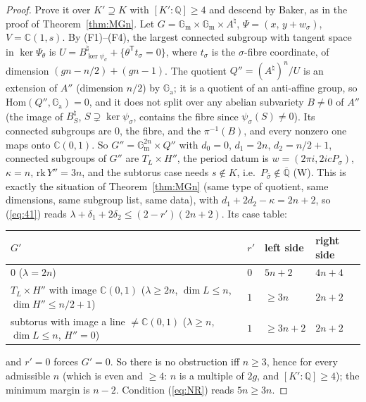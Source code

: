 \documentclass[11pt]{amsart}
\theoremstyle{definition}
\newcommand{\Qb}{\overline{\mathbb{Q}}}
\newcommand{\C}{\mathbb{C}}
\newcommand{\Q}{\mathbb{Q}}
\newcommand{\Ga}{\mathbb{G}_{\mathrm a}}
\newcommand{\Gm}{\mathbb{G}_{\mathrm m}}
\begin{document}
\begin{proof}
Prove it over $K'\supseteq K$ with $[K':\Q]\ge4$ and descend by Baker, as in the proof of Theorem~\ref{thm:MGn}. Let
$G=\Gm\times\Gm\times A^\natural$, $\Psi=(x,\,y+w_\sigma)$, $V=\C(1,s)$. By (F1)--(F4), the largest connected subgroup
with tangent space in $\ker\Psi_\theta$ is $U=B^\natural_{\ker\psi_\sigma}+\{\theta^{\mathsf T}t_\sigma=0\}$, where $t_\sigma$ is the
$\sigma$-fibre coordinate, of dimension $(gn-n/2)+(gn-1)$. The quotient $Q''=(A^\natural)^n/U$ is an extension of
$A''$ (dimension $n/2$) by $\Ga$; it is a quotient of an anti-affine group, so $\mathrm{Hom}(Q'',\Ga)=0$, and it does not
split over any abelian subvariety $B\ne0$ of $A''$ (the image of $B_{S}^\natural$, $S\supsetneq\ker\psi_\sigma$, contains the
fibre since $\psi_\sigma(S)\ne0$). Its connected subgroups are $0$, the fibre, and the $\pi^{-1}(B)$, and every nonzero
one maps onto $\C(0,1)$. So $G''=\Gm^{2n}\times Q''$ with $d_0=0$, $d_1=2n$, $d_2=n/2+1$, connected subgroups of $G''$
are $T_L\times H''$, the period datum is $w=(2\pi i,2icP_\sigma)$, $\kappa=n$, $\mathrm{rk}\,Y''=3n$, and the subtorus case
needs $s\notin K$, i.e.\ $P_{\bar\sigma}\notin\Qb$ (W). This is exactly the situation of Theorem~\ref{thm:MGn} (same type of
quotient, same dimensions, same subgroup list, same data), with $d_1+2d_2-\kappa=2n+2$, so (\ref{eq:41}) reads
$\lambda+\delta_1+2\delta_2\le(2-r')(2n+2)$. Its case table:
\begin{center}
\begin{tabular}{>{\raggedright\arraybackslash}p{7.6cm}lll}
$G'$ & $r'$ & left side & right side\\\hline
$0$ ($\lambda=2n$) & $0$ & $5n+2$ & $4n+4$\\
$T_L\times H''$ with image $\C(0,1)$ ($\lambda\ge2n$, $\dim L\le n$, $\dim H''\le n/2+1$) & $1$ & $\ge3n$ & $2n+2$\\
subtorus with image a line $\neq\C(0,1)$ ($\lambda\ge n$, $\dim L\le n$, $H''=0$) & $1$ & $\ge3n+2$ & $2n+2$
\end{tabular}
\end{center}
and $r'=0$ forces $G'=0$. So there is no obstruction iff $n\ge3$, hence for every admissible $n$ (which is even and
$\ge4$: $n$ is a multiple of $2g$, and $[K':\Q]\ge4$); the minimum margin is $n-2$. Condition (\ref{eq:NR}) reads $5n\ge3n$.
\end{proof}
\end{document}
